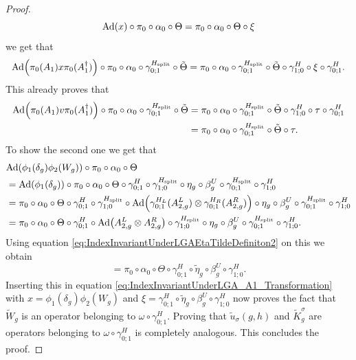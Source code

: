 \documentclass[12pt,a4paper,twoside]{article}
\numberwithin{equation}{section}
\begin{document}
\begin{proof}
	\begin{equation}
		\Ad{x}\circ\pi_0\circ\alpha_0\circ\Theta=\pi_0\circ\alpha_0\circ\Theta\circ\xi
	\end{equation}
	we get that
	\begin{equation}\label{eq:IndexInvariantUnderLGA_A1_Transformation}
		\Ad{\pi_0(A_1)x\pi_0(A_1^\dagger)}\circ\pi_0\circ\alpha_0\circ\gamma^{H_\text{split}}_{0;1}\circ\tilde{\Theta}=\pi_0\circ\alpha_0\circ\gamma^{H_\text{split}}_{0;1}\circ\tilde{\Theta}\circ\gamma^H_{1;0}\circ\xi\circ\gamma^H_{0;1}.
	\end{equation}
	This already proves that
	\begin{align}
		\Ad{\pi_0(A_1)v\pi_0(A_1^\dagger)}\circ\pi_0\circ\alpha_0\circ\gamma^{H_\text{split}}_{0;1}\circ\tilde{\Theta}&=\pi_0\circ\alpha_0\circ\gamma^{H_\text{split}}_{0;1}\circ\tilde{\Theta}\circ\gamma^H_{1;0}\circ\tau\circ\gamma^H_{0;1}\\
		&=\pi_0\circ\alpha_0\circ\gamma^{H_\text{split}}_{0;1}\circ\tilde{\Theta}\circ\tau.
	\end{align}
	To show the second one we get that
	\begin{align}
		&\Ad{\phi_1(\delta_g)\phi_2(W_g)}\circ\pi_0\circ\alpha_0\circ\Theta\\
		&=\Ad{\phi_1(\delta_g)}\circ\pi_0\circ\alpha_0\circ\Theta\circ\gamma^{H}_{0;1}\circ\gamma^{H_\text{split}}_{1;0}\circ\eta_g\circ\beta_g^U\circ\gamma^{H_\text{split}}_{0;1}\circ\gamma^H_{1;0}\\
		&=\pi_0\circ\alpha_0\circ\Theta\circ\gamma^{H}_{0;1}\circ\gamma^{H_\text{split}}_{1;0}\circ\Ad{\gamma^{H_L}_{0;1}(A_{2,g}^L)\otimes\gamma^{H_R}_{0;1}(A_{2,g}^R)}\circ\eta_g\circ\beta_g^U\circ\gamma^{H_\text{split}}_{0;1}\circ\gamma^H_{1;0}\\
		&=\pi_0\circ\alpha_0\circ\Theta\circ\gamma^{H}_{0;1}\circ\Ad{A_{2,g}^L\otimes A_{2,g}^R}\circ\gamma^{H_\text{split}}_{1;0}\circ\eta_g\circ\beta_g^U\circ\gamma^{H_\text{split}}_{0;1}\circ\gamma^H_{1;0}.
	\end{align}
	Using equation \eqref{eq:IndexInvariantUnderLGAEtaTildeDefiniton2} on this we obtain
	\begin{equation}
		=\pi_0\circ\alpha_0\circ\Theta\circ\gamma^H_{0;1}\circ\tilde{\eta}_g\circ\beta_g^U\circ\gamma^H_{1;0}.
	\end{equation}
	Inserting this in equation \eqref{eq:IndexInvariantUnderLGA_A1_Transformation} with $x=\phi_1(\delta_g)\phi_2(W_g)$ and $\xi=\gamma^H_{0;1}\circ\tilde{\eta}_g\circ\beta_g^U\circ\gamma^H_{1;0}$ now proves the fact that $\tilde{W}_g$ is an operator belonging to $\omega\circ\gamma^H_{0;1}$. Proving that $\tilde u_\sigma(g,h)$ and $\tilde{K}_g^\sigma$ are operators belonging to $\omega\circ\gamma_{0;1}^H$ is completely analogous. This concludes the proof.
\end{proof}
\clearpage
\end{document}
